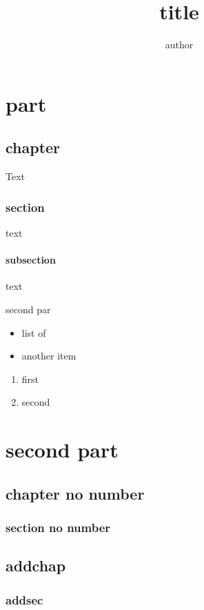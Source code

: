 \documentclass{book}
\title{title}
\author{author}
\begin{document}
\maketitle

\tableofcontents

\part{part}

\chapter{chapter}

Text

\section{section}

text

\subsection{subsection}

text

second par

\begin{itemize}
\item list of
\item another item
\end{itemize}


\begin{enumerate}
\item first
\item second
\end{enumerate}

\part{second part}

\chapter*{chapter no number}

\section*{section no number}


\chapter*{addchap}

\section*{addsec}
\end{document}
